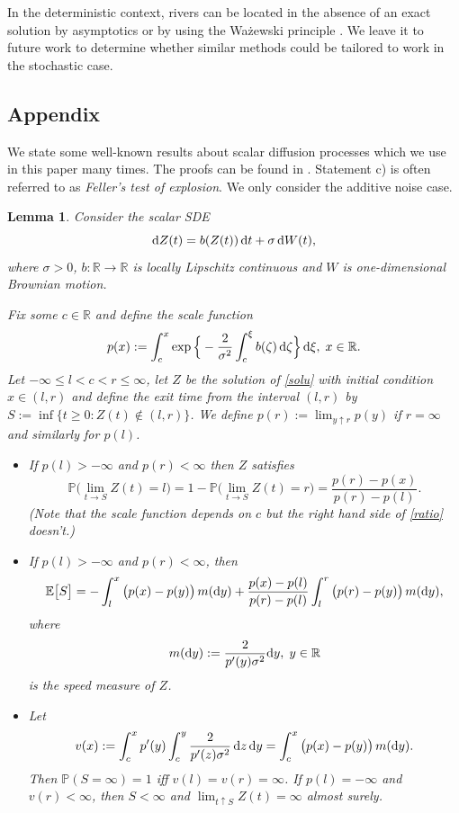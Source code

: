 \documentclass[sn-mathphys-num]{sn-jnl}
\newtheorem{lem}[thm]{Lemma}
\theoremstyle{definition}
\newcommand{\scr}[1]{\mathscr #1}
\numberwithin{equation}{section} \theoremstyle{remark}
\renewcommand{\d}{\hbox{d}}
\def\R{\mathbb R}
\def\d{\text{\rm{d}}} \def\bb{\beta} \def\aa{\alpha} \def\D{\scr D}
\def\P{\mathbb P}
\newcommand{\1}{\mathbbm{1}}
\begin{document}
In the deterministic context, rivers can be
located in the absence of an exact solution by asymptotics
\cite{Blais} or by using the Wa\.zewski principle \cite{Srz,Waz}. We
leave it to future work to determine whether similar methods could be
tailored to work in the stochastic case.  



\begin{appendices}

\section{Appendix}
We state some well-known results about scalar diffusion processes which we use in this paper many times. The proofs can be found in \cite[Section 5.5.5]{KS}. Statement c) is often referred to as {\em Feller's test of explosion}. We only consider the additive noise case.
\begin{lem}\label{1ddiff}
  Consider the scalar SDE
  \begin{equation}\label{solu}
\d Z(t) = b(Z(t))\, \d t + \sigma \,\d W(t), 
\end{equation}
where $\sigma>0$, $b:\R \to \R$ is locally Lipschitz continuous and $W$ is one-dimensional Brownian motion.
 
Fix some $c \in \R$ and define the {\em scale function}
$$
p(x):=\int_c^x\exp\Big\{ -\frac 2{\sigma^2}\int_c^\xi b(\zeta)\,\d \zeta\Big\}\,\d \xi,\;x \in \R.
$$
Let $-\infty\leq l < c<r \leq \infty$, let $Z$ be  the solution of \eqref{solu} with initial condition $x \in (l,r)$ and define  the exit time from the interval $(l,r)$ by $S:=\inf\{t \geq 0: Z(t) \notin (l,r)\}$. We define $p(r):=\lim_{y \uparrow r}p(y)$ if $r=\infty$ and similarly for $p(l)$. 
\begin{itemize}
\item [a)] If $p(l)>-\infty$ and $p(r)<\infty$ then $Z$ satisfies 
\begin{equation}\label{ratio}
\P\Big(\lim_{t \to S}Z(t)=l    \Big)=1-\P\Big(\lim_{t \to S}Z(t)=r    \Big)=\frac{p(r)-p(x)}{p(r)-p(l)}.
\end{equation}
(Note that the scale function depends on $c$ but the right hand side of \eqref{ratio} doesn't.)

\item[b)] If $p(l)>-\infty$ and $p(r)<\infty$, then
$$
\E\big[S\big]= -\int_l^x\big(p(x)-p(y)\big)\,m(\d y)+  \frac{p(x)-p(l)}{p(r)-p(l)}\int_l^r\big(p(r)-p(y)\big)\,m(\d y),
$$
where
$$
m(\d y):=\frac 2{p'(y)\sigma^2}\d y,\;y\in \R
$$
is the {\em speed measure} of $Z$.
\item[c)]
  Let
  $$
v(x):=\int_c^xp'(y)\int_c^y\frac 2{p'(z)\sigma^2}\,\d z\,\d y=\int_c^x\big(p(x)-p(y)\big)\,m(\d y).
$$
Then $\P (S=\infty)=1$ iff $v(l)=v(r)=\infty$. If $p(l)=-\infty$ and $v(r)<\infty$, then $S<\infty$ and $\lim_{t \uparrow S}Z(t)=\infty$ almost surely.  
  \end{itemize}
\end{lem}


\end{appendices}
\end{document}
